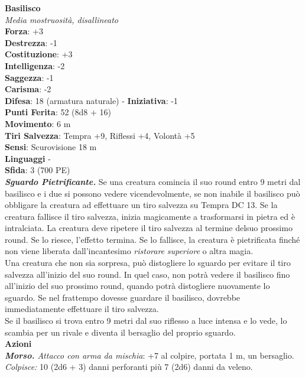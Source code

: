 \begin{multicols}{2}
\medskip\textbf{Basilisco}\\
\emph{Media mostruosità, disallineato}\\
\textbf{Forza}: +3\\
\textbf{Destrezza}: -1\\
\textbf{Costituzione}: +3\\
\textbf{Intelligenza}: -2\\
\textbf{Saggezza}: -1\\
\textbf{Carisma}: -2\\
\textbf{Difesa}: 18 (armatura naturale) - \textbf{Iniziativa}: -1\\
\textbf{Punti Ferita}: 52 (8d8 + 16)\\
\textbf{Movimento}: 6 m\\
\textbf{Tiri Salvezza}: Tempra +9, Riflessi +4, Volontà +5\\
\textbf{Sensi}: Scurovisione 18 m\\
\textbf{Linguaggi} -\\
\textbf{Sfida}: 3 (700 PE)\smallskip\\
\emph{\textbf{Sguardo Pietrificante.}} Se una creatura comincia il suo round entro 9 metri dal basilisco e i due si possono vedere vicendevolmente, se non inabile il basilisco può obbligare la creatura ad effettuare un tiro salvezza su Tempra DC  13. Se la creatura fallisce il tiro  salvezza, inizia magicamente a trasformarsi in pietra ed è   intralciata. La creatura deve ripetere il tiro salvezza al termine delsuo prossimo round. Se lo riesce, l'effetto termina. Se lo fallisce,   la creatura è pietrificata finché non viene liberata dall'incantesimo  \emph{ristorare} \emph{superiore} o altra magia. \\
Una creatura che non sia sorpresa, può distogliere lo sguardo per evitare il tiro salvezza all'inizio del suo round. In quel caso, non potrà vedere il basilisco fino all'inizio del suo prossimo round, quando potrà distogliere nuovamente lo sguardo. Se nel frattempo dovesse guardare il basilisco, dovrebbe immediatamente effettuare il tiro salvezza.\\
Se il basilisco si trova entro 9 metri dal suo riflesso a luce intensa e lo vede, lo scambia per un rivale e diventa il bersaglio del proprio sguardo.\\
\smallskip\textbf{Azioni}\\
\emph{\textbf{Morso.} Attacco con arma da mischia}: +7 al colpire, portata 1 m, un bersaglio. \\
\emph{Colpisce:} 10 (2d6 + 3) danni perforanti più 7 (2d6) danni da veleno.\\

\end{multicols}
